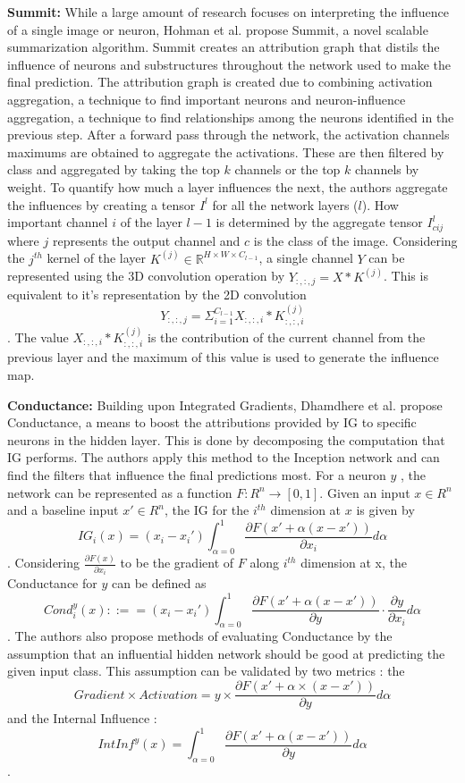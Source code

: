 \textbf{Summit: }
While a large amount of research focuses on interpreting the influence of a single image or neuron, Hohman et al. propose Summit, \cite{hohmanSummitScalingDeep2019} a novel scalable summarization algorithm. Summit creates an attribution graph that distils the influence of neurons and substructures throughout the network used to make the final prediction. The attribution graph is created due to combining activation aggregation, a technique to find important neurons and neuron-influence aggregation, a technique to find relationships among the neurons identified in the previous step. After a forward pass through the network, the activation channels maximums are obtained to aggregate the activations. These are then filtered by class and aggregated by taking the top $k$ channels or the top $k$ channels by weight. To quantify how much a layer influences the next, the authors aggregate the influences by creating a tensor $I^{l}$ for all the network layers ($l$). How important channel $i$ of the layer $l-1$ is determined by the aggregate tensor $I^{l}_{cij}$ where $j$ represents the output channel and $c$ is the class of the image. Considering the $j^{th}$ kernel of the layer $K^{(j)} \in \mathbb{R}^{H \times W \times C_{l-1}}$, a single channel $Y$ can be represented using the 3D convolution operation by $Y_{:,:,j}= X \ast K^{(j)}$. This is equivalent to it's representation by the 2D convolution $$Y_{:,:,j}= \Sigma_{i=1}^{C_{l-1}} X_{:,:,i} \ast K^{(j)}_{:,:,i}$$. The value $X_{:,:,i} \ast K^{(j)}_{:,:,i}$ is the contribution of the current channel from the previous layer and the maximum of this value is used to generate the influence map.

\textbf{Conductance: }
Building upon Integrated Gradients, Dhamdhere et al. propose \cite{dhamdhereHowImportantNeuron2018} Conductance, a means to boost the attributions provided by IG to specific neurons in the hidden layer. This is done by decomposing the computation that IG performs. The authors apply this method to the Inception network \cite{szegedyGoingDeeperConvolutions2014} and can find the filters that influence the final predictions most. 
For a neuron $y$ , the network can be represented as a function $F:R^{n} \rightarrow [0,1]$. Given an input $x \in R^{n}$ and a baseline input $x' \in R^{n}$, the IG for the $i^{th}$ dimension at $x$ is given by $$IG_{i}(x) = (x_{i}- x_{i}') \int_{\alpha=0}^{1} \frac{\partial F(x' + \alpha(x-x'))}{\partial x_{i}}d \alpha$$ . Considering $\frac{\partial F(x)}{\partial x_{i}}$ to be the gradient of $F$ along $i^{th}$ dimension at x, the Conductance for $y$ can be defined as $$
Cond_{i}^{y}(x) ::== (x_{i}- x_{i}') \int_{\alpha=0}^{1} \frac{\partial F(x' + \alpha(x-x'))}{\partial y} \cdot \frac{\partial y}{\partial x_{i}} d \alpha$$. The authors also propose methods of evaluating Conductance by the assumption that an influential hidden network should be good at predicting the given input class. This assumption can be validated by two metrics : the $$Gradient\times Activation = 
y \times \frac{\partial F(x' + \alpha \times (x-x'))}{\partial y} d \alpha$$ and the Internal Influence : $$
IntInf ^{y}(x) = \int^{1}_{\alpha=0} \frac{\partial F(x' + \alpha(x-x'))}{\partial y} d \alpha$$.\\

